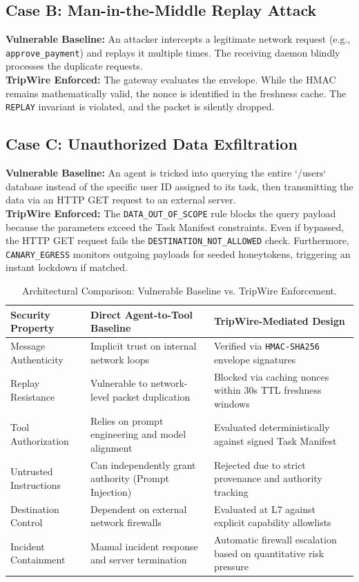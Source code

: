 \documentclass[10pt,a4paper]{article}
\begin{document}
\subsection{Case B: Man-in-the-Middle Replay Attack}
\textbf{Vulnerable Baseline:} An attacker intercepts a legitimate network request (e.g., \texttt{approve\_payment}) and replays it multiple times. The receiving daemon blindly processes the duplicate requests. \\
\textbf{TripWire Enforced:} The gateway evaluates the envelope. While the HMAC remains mathematically valid, the nonce is identified in the freshness cache. The \texttt{REPLAY} invariant is violated, and the packet is silently dropped.

\subsection{Case C: Unauthorized Data Exfiltration}
\textbf{Vulnerable Baseline:} An agent is tricked into querying the entire `/users` database instead of the specific user ID assigned to its task, then transmitting the data via an HTTP GET request to an external server. \\
\textbf{TripWire Enforced:} The \texttt{DATA\_OUT\_OF\_SCOPE} rule blocks the query payload because the parameters exceed the Task Manifest constraints. Even if bypassed, the HTTP GET request fails the \texttt{DESTINATION\_NOT\_ALLOWED} check. Furthermore, \texttt{CANARY\_EGRESS} monitors outgoing payloads for seeded honeytokens, triggering an instant lockdown if matched.

\begin{table}[htbp]
\centering
\begin{tabularx}{\textwidth}{l X X}
\toprule
\textbf{Security Property} & \textbf{Direct Agent-to-Tool Baseline} & \textbf{TripWire-Mediated Design} \\
\midrule
Message Authenticity & Implicit trust on internal network loops & Verified via \texttt{HMAC-SHA256} envelope signatures \\
Replay Resistance & Vulnerable to network-level packet duplication & Blocked via caching nonces within 30s TTL freshness windows \\
Tool Authorization & Relies on prompt engineering and model alignment & Evaluated deterministically against signed Task Manifest \\
Untrusted Instructions & Can independently grant authority (Prompt Injection) & Rejected due to strict provenance and authority tracking \\
Destination Control & Dependent on external network firewalls & Evaluated at L7 against explicit capability allowlists \\
Incident Containment & Manual incident response and server termination & Automatic firewall escalation based on quantitative risk pressure \\
\bottomrule
\end{tabularx}
\caption{Architectural Comparison: Vulnerable Baseline vs. TripWire Enforcement.}
\label{tab:comparison}
\end{table}
\end{document}
